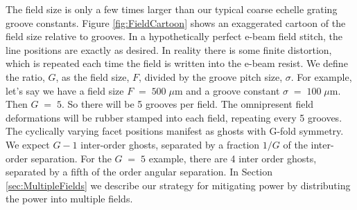 \documentclass[]{spie}  %
\begin{document}
The field size is only a few times larger than our typical coarse echelle grating groove constants.  Figure \ref{fig:FieldCartoon} shows an exaggerated cartoon of the field size relative to grooves.  In a hypothetically perfect e-beam field stitch, the line positions are exactly as desired.  In reality there is some finite distortion, which is repeated each time the field is written into the e-beam resist.  We define the ratio, $G$, as the field size, $F$, divided by the groove pitch size, $\sigma$.  For example, let's say we have a field size $F\;=\;500\;\mu$m and a groove constant $\sigma \; =\; 100 \; \mu$m.  Then $G\;=\;5$.  So there will be 5 grooves per field.  The omnipresent field deformations will be rubber stamped into each field, repeating every 5 grooves.  The cyclically varying facet positions manifest as ghosts with G-fold symmetry. We expect $G-1$ inter-order ghosts, separated by a fraction $1/G$ of the inter-order separation.  For the $G\;=\;5$ example, there are 4 inter order ghosts, separated by a fifth of the order angular separation.  In Section \ref{sec:MultipleFields} we describe our strategy for mitigating power by distributing the power into multiple fields.
\end{document}
